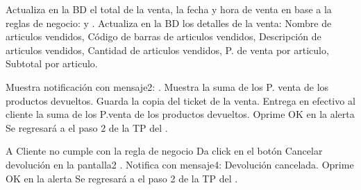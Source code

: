 \begin{UCtrayectoria}
	\UCpaso [\UCsist] Actualiza en la BD el total de la venta, la fecha y hora de venta en base a la reglas de negocio:  y .
	\UCpaso [\UCsist] Actualiza en la BD los detalles de la venta: Nombre de articulos vendidos, Código de barras de articulos vendidos, Descripción de articulos vendidos, Cantidad de articulos vendidos, P. de venta por articulo, Subtotal por articulo.

	\UCpaso [\UCsist] Muestra notificación con mensaje2: .
	\UCpaso [\UCsist] Muestra la suma de los P. venta de los productos devueltos.
	\UCpaso [\UCactor] Guarda la copia del ticket de la venta.
	\UCpaso [\UCactor] Entrega en efectivo al cliente la suma de los P.venta de los productos devueltos.
	\UCpaso [\UCactor] Oprime OK en la alerta 
	\UCpaso [\UCsist] Se regresará a el paso 2 de la TP del .

\end{UCtrayectoria}


\begin{UCtrayectoriaA}{A}{ Cliente no cumple con la regla de negocio   }
	\UCpaso [\UCactor] Da click en el botón Cancelar devolución en la pantalla2 . 
	\UCpaso [\UCsist] Notifica con mensaje4: {Devolución cancelada}.
	\UCpaso [\UCactor] Oprime OK en la alerta 
	\UCpaso [\UCsist] Se regresará a el paso 2 de la TP del .
\end{UCtrayectoriaA}

